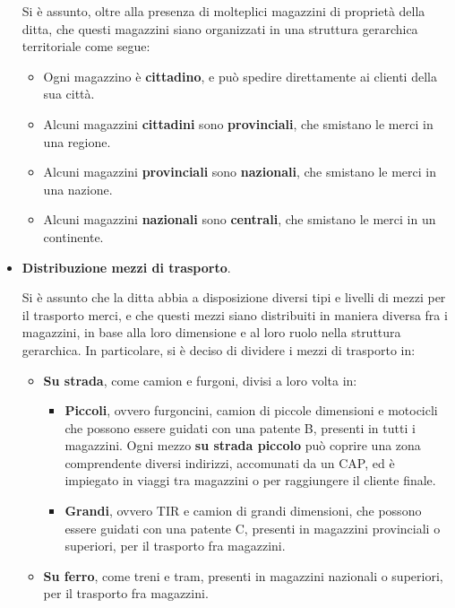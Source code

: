 \begin{itemize}
  Si è assunto, oltre alla presenza di molteplici magazzini di proprietà della ditta, che questi magazzini siano organizzati in una struttura gerarchica territoriale come segue:
  \begin{itemize}
    \item Ogni magazzino è \textbf{cittadino}, e può spedire direttamente ai clienti della sua città.
    \item Alcuni magazzini \textbf{cittadini} sono \textbf{provinciali}, che smistano le merci in una regione.
    \item Alcuni magazzini \textbf{provinciali} sono \textbf{nazionali}, che smistano le merci in una nazione.
    \item Alcuni magazzini \textbf{nazionali} sono \textbf{centrali}, che smistano le merci in un continente.
    \end{itemize}

  \item \textbf{Distribuzione mezzi di trasporto}.
  
  Si è assunto che la ditta abbia a disposizione diversi tipi e livelli di mezzi per il trasporto merci, e che questi mezzi siano distribuiti in maniera diversa fra i magazzini, in base alla loro dimensione e al loro ruolo nella struttura gerarchica. In particolare, si è deciso di dividere i mezzi di trasporto in:
  
  \begin{itemize}
    \item \textbf{Su strada}, come camion e furgoni, divisi a loro volta in:
      \begin{itemize}
        \item \textbf{Piccoli}, ovvero furgoncini, camion di piccole dimensioni e motocicli che possono essere guidati con una patente B, presenti in tutti i magazzini. Ogni mezzo \textbf{su strada piccolo} può coprire una zona comprendente diversi indirizzi, accomunati da un CAP, ed è impiegato in viaggi tra magazzini o per raggiungere il cliente finale.
        \item \textbf{Grandi}, ovvero TIR e camion di grandi dimensioni, che possono essere guidati con una patente C, presenti in magazzini provinciali o superiori, per il trasporto fra magazzini.
      \end{itemize}
    
    \item \textbf{Su ferro}, come treni e tram, presenti in magazzini nazionali o superiori, per il trasporto fra magazzini.
    

\end{itemize}
\end{itemize}
